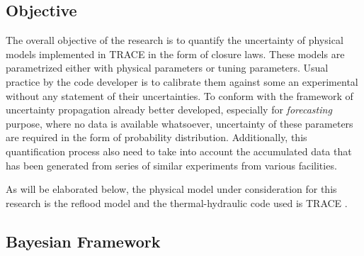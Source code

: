 \documentclass[11pt,titlepage]{article}
\begin{document}



\subsection{Objective}

The overall objective of the research is to quantify the uncertainty of physical models implemented in TRACE in the form of closure laws. These models are parametrized either with physical parameters or tuning parameters. Usual practice by the code developer is to calibrate them against some an experimental without any statement of their uncertainties. To conform with the framework of uncertainty propagation already better developed, especially for \emph{forecasting} purpose, where no data is available whatsoever, uncertainty of these parameters are required in the form of probability distribution. Additionally, this quantification process also need to take into account the accumulated data that has been generated from series of similar experiments from various facilities.

As will be elaborated below, the physical model under consideration for this research is the reflood model and the thermal-hydraulic code used is TRACE \cite{TraceTheory2012}.

\subsection{Bayesian Framework}
\end{document}
